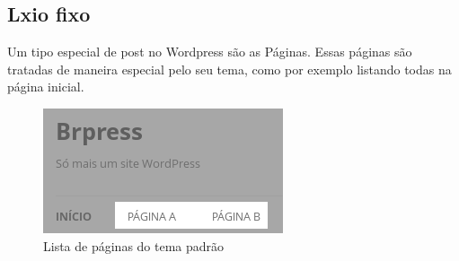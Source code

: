 \documentclass[12pt,onecolumn]{article}
\begin{document}
	\subsection{Lxio fixo}
		Um tipo especial de post no Wordpress são as Páginas.
		Essas páginas são tratadas de maneira especial pelo seu tema, como por exemplo listando todas na página inicial.
		\begin{figure}[H]
			\centering
			\includegraphics{page1.png}
			\caption{Lista de páginas do tema padrão}
		\end{figure}
		
\end{document}
